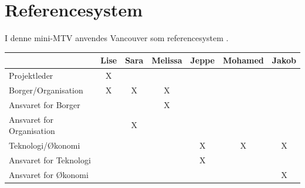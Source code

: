 \section{Referencesystem}
I denne mini-MTV anvendes Vancouver som referencesystem \cite{vancouver}.


\begin{table}[h]
\begin{tabular}{lcccccc}
& Lise & Sara & Melissa &Jeppe &Mohamed & Jakob\\
\midrule
Projektleder &  X & & & & &\\
\midrule
Borger/Organisation &X & X & X & & &\\
Ansvaret for Borger & &  & X& & &\\
Ansvaret for Organisation & & X&  & & &\\
\midrule
Teknologi/Økonomi & & & & X &  X & X\\
Ansvaret for Teknologi & & & & X & &\\
Ansvaret for Økonomi & & & & & &X\\

\end{tabular}
\end{table} 

  
	

